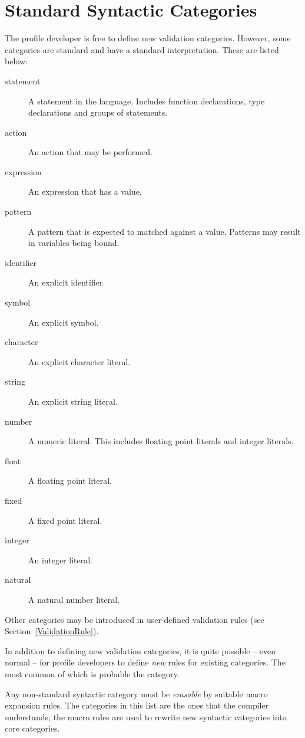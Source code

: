 \section{Standard Syntactic Categories}
\label{standardCategories}
The profile developer is free to define new validation categories. However, some categories are standard and have a standard interpretation. These are listed below:
\begin{description}
\item[statement] A statement in the language. Includes function declarations, type declarations and groups of statements.
\item[action] An action that may be performed.
\item[expression] An expression that has a value.
\item[pattern] A pattern that is expected to matched against a value. Patterns may result in variables being bound. 
\item[identifier] An explicit identifier.
\item[symbol] An explicit symbol.
\item[character] An explicit character literal.
\item[string] An explicit string literal.
\item[number] A numeric literal. This includes floating point literals and integer literals.
\item[float] A floating point literal.
\item[fixed] A fixed point literal.
\item[integer] An integer literal.
\item[natural] A natural number literal.
\end{description}
Other categories may be introduced in user-defined validation rules (see Section~\vref{ValidationRule}).

In addition to defining new validation categories, it is quite possible -- even normal -- for profile developers to define \emph{new} rules for existing categories. The most common of which is probable the  category.

\begin{aside}
Any non-standard syntactic category must be \emph{erasable} by suitable macro expansion rules. The categories in this list are the ones that the \Sr compiler understands; the macro rules are used to rewrite new syntactic categories into core categories.
\end{aside}



